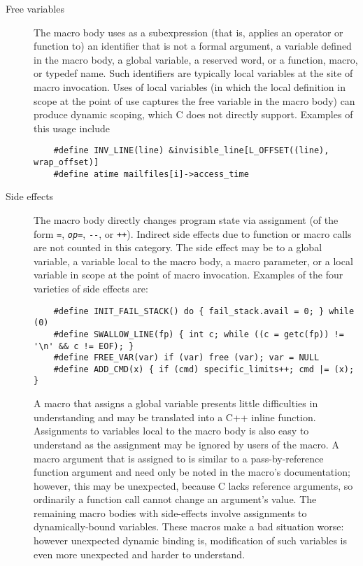 \documentclass[10pt]{article}
\begin{document}
\label{desc:properties}

\begin{description}
\item[Free variables]\label{page:freevar}
  The macro body uses as a subexpression (that is, applies an operator or
  function to) an identifier that is not a formal argument, a variable defined
  in the macro body, a global variable, a reserved word, or a function, macro, or typedef
  name.  Such identifiers are typically local variables at the site of
  macro invocation.  Uses of local variables (in which the local definition
  in scope at the point of use captures the free variable in the macro
  body) can produce dynamic scoping, which C does not directly support.
  Examples of this usage include
\begin{verbatim}
    #define INV_LINE(line) &invisible_line[L_OFFSET((line), wrap_offset)]
    #define atime mailfiles[i]->access_time
\end{verbatim}

\item[Side effects]
  The macro body directly changes program state via assignment (of the form
  {\tt =}, {\tt {\em op}=}, {\tt -{}-}, or {\tt ++}).  
  Indirect side
  effects due to function or macro calls are not counted in this category.
  The side effect may be to a
  global variable, a variable local to the macro body, a macro parameter,
  or a local variable in scope at the point of macro invocation.
  Examples of the four varieties of side effects are:
\begin{verbatim}
    #define INIT_FAIL_STACK() do { fail_stack.avail = 0; } while (0)
    #define SWALLOW_LINE(fp) { int c; while ((c = getc(fp)) != '\n' && c != EOF); }
    #define FREE_VAR(var) if (var) free (var); var = NULL
    #define ADD_CMD(x) { if (cmd) specific_limits++; cmd |= (x); }
\end{verbatim}

  A macro that assigns a global variable presents little difficulties in
  understanding and may be translated into a C++ inline function.
  Assignments to variables local to the macro body is also easy to understand
  as the assignment may be ignored by users
  of the macro.  A macro argument that is assigned to is similar to a
  pass-by-reference function argument and need only be noted in the macro's
  documentation; however, this may be unexpected, because C lacks reference
  arguments, so ordinarily a function call cannot change an argument's
  value.  The remaining macro bodies with side-effects involve assignments
  to dynamically-bound variables.  These macros make a bad situation worse: however
  unexpected dynamic binding is, modification of such variables is even
  more unexpected and harder to understand.
  


\end{description}
\end{document}
